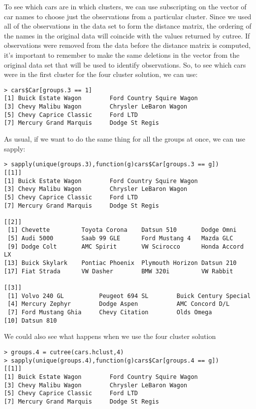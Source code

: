 {\begin{framed}
\begin{verbatim}
\end{verbatim}
\end{framed}
To see which cars are in which clusters, we can use subscripting on the vector of car names to choose just the observations from a particular cluster. Since we used all of the observations in the data set to form the distance matrix, the ordering of the names in the original data will coincide with the values returned by cutree. If observations were removed from the data before the distance matrix is computed, it's important to remember to make the same deletions in the vector from the original data set that will be used to identify observations. So, to see which cars were in the first cluster for the four cluster solution, we can use:
\begin{framed}
\begin{verbatim}
> cars$Car[groups.3 == 1]
[1] Buick Estate Wagon        Ford Country Squire Wagon
[3] Chevy Malibu Wagon        Chrysler LeBaron Wagon
[5] Chevy Caprice Classic     Ford LTD
[7] Mercury Grand Marquis     Dodge St Regis
\end{verbatim}
\end{framed}
As usual, if we want to do the same thing for all the groups at once, we can use sapply:
\begin{framed}
\begin{verbatim}
> sapply(unique(groups.3),function(g)cars$Car[groups.3 == g])
[[1]]
[1] Buick Estate Wagon        Ford Country Squire Wagon
[3] Chevy Malibu Wagon        Chrysler LeBaron Wagon
[5] Chevy Caprice Classic     Ford LTD
[7] Mercury Grand Marquis     Dodge St Regis

[[2]]
 [1] Chevette         Toyota Corona    Datsun 510       Dodge Omni
 [5] Audi 5000        Saab 99 GLE      Ford Mustang 4   Mazda GLC
 [9] Dodge Colt       AMC Spirit       VW Scirocco      Honda Accord LX
[13] Buick Skylark    Pontiac Phoenix  Plymouth Horizon Datsun 210
[17] Fiat Strada      VW Dasher        BMW 320i         VW Rabbit

[[3]]
 [1] Volvo 240 GL          Peugeot 694 SL        Buick Century Special
 [4] Mercury Zephyr        Dodge Aspen           AMC Concord D/L
 [7] Ford Mustang Ghia     Chevy Citation        Olds Omega
[10] Datsun 810

\end{verbatim}
\end{framed}
We could also see what happens when we use the four cluster solution
\begin{framed}
\begin{verbatim}
> groups.4 = cutree(cars.hclust,4)
> sapply(unique(groups.4),function(g)cars$Car[groups.4 == g])
[[1]]
[1] Buick Estate Wagon        Ford Country Squire Wagon
[3] Chevy Malibu Wagon        Chrysler LeBaron Wagon
[5] Chevy Caprice Classic     Ford LTD
[7] Mercury Grand Marquis     Dodge St Regis


\end{verbatim}
\end{framed}}
